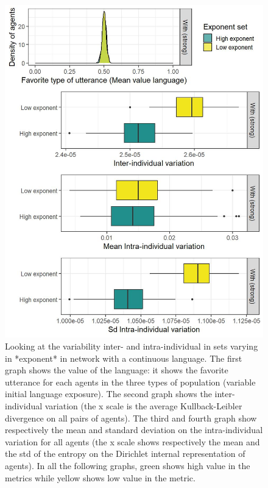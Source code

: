 \documentclass[
]{article}
\begin{document}
\begin{figure}[!H]

{\centering \includegraphics{./Figures/unnamed-chunk-48-1} 

}

\caption{Looking at the variability inter- and intra-individual in sets varying in *exponent* in network with a continuous language. The first graph shows the value of the language: it shows the favorite utterance for each agents in the three types of population (variable initial language exposure). The second graph shows the  inter-individual variation (the x scale is the average Kullback-Leibler divergence on all pairs of agents). The third and fourth graph show respectively the mean and standard deviation on the intra-individual variation for all agents (the x scale shows respectively the mean and the std of the entropy on the Dirichlet internal representation of agents). In all the following graphs, green shows high value in the metrics while yellow shows low value in the metric.}\label{fig:unnamed-chunk-48}
\end{figure}
\end{document}
